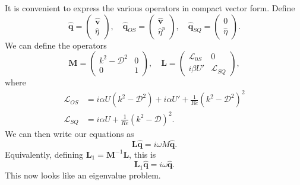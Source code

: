 \documentclass[a4paper]{article}
\begin{document}
It is convenient to express the various operators in compact vector form. Define
\[
  \hat{\mathbf{q}} =
  \begin{pmatrix}
    \hat{\mathbf{v}}\\\hat{\eta}
  \end{pmatrix},\quad
  \hat{\mathbf{q}}_{OS} =
  \begin{pmatrix}
    \hat{\mathbf{v}}\\ \hat{\eta}^p
  \end{pmatrix},\quad
  \hat{\mathbf{q}}_{SQ} =
  \begin{pmatrix}
    0 \\ \hat{\eta}
  \end{pmatrix}.
\]
We can define the operators
\[
  \mathbf{M} =
  \begin{pmatrix}
    k^2 - \mathcal{D}^2 & 0\\
    0 & 1
  \end{pmatrix},\quad
  \mathbf{L} =
  \begin{pmatrix}
    \mathcal{L}_{0S} & 0\\
    i \beta U' & \mathcal{L}_{SQ}
  \end{pmatrix},
\]
where
\begin{align*}
  \mathcal{L}_{OS} &= i\alpha U(k^2 - \mathcal{D}^2) + i \alpha U' + \frac{1}{Re} (k^2 - \mathcal{D}^2)^2\\
  \mathcal{L}_{SQ} &= i\alpha U + \frac{1}{Re}(k^2 - \mathcal{D})^2.
\end{align*}
We can then write our equations as
\[
  \mathbf{L}\hat{\mathbf{q}} = i \omega M \hat{\mathbf{q}}.
\]
Equivalently, defining $\mathbf{L}_1 = \mathbf{M}^{-1} \mathbf{L}$, this is
\[
  \mathbf{L}_1 \hat{\mathbf{q}} = i \omega \hat{\mathbf{q}}.
\]
This now looks like an eigenvalue problem.
\end{document}
